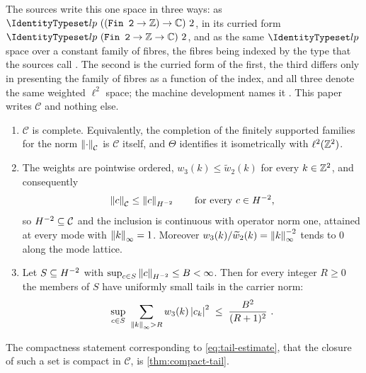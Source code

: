 \begin{remark}\label{rem:carrier-notations}
The sources write this one space in three ways: as
$\lmod{lp}\ ((\texttt{Fin 2}\to\Z)\to\C)\ 2$, in its curried form
$\lmod{lp}\ (\texttt{Fin 2}\to\Z\to\C)\ 2$, and as the same $\lmod{lp}$
space over a constant family of fibres, the fibres being indexed by the type that
the sources call . The second is the curried form of
the first, the third differs only in presenting the family of fibres as a
function of the index, and all three denote the same weighted $\ell^2$ space; the
machine development names it . This paper
writes $\mathcal C$ and nothing else.
\end{remark}

\begin{proposition}\label{prop:completion}
\mbox{}
\begin{enumerate}
\item $\mathcal C$ is complete. Equivalently, the completion of the finitely
  supported families for the norm $\left\| \cdot \right\|_{\mathcal C}$ is $\mathcal C$
  itself, and $\Theta$ identifies it isometrically with $\ell^2(\mathbb{Z}^2)$.
\item The weights are pointwise ordered, $w_3(k)\le\widetilde w_2(k)$ for every
  $k\in\mathbb{Z}^2$, and consequently
  \begin{equation}\label{eq:embedding}
    \left\| c \right\|_{\mathcal C}\le\left\| c \right\|_{H^{-2}}
    \qquad\text{for every } c\in H^{-2},
  \end{equation}
  so $H^{-2}\subseteq\mathcal C$ and the inclusion is continuous with operator
  norm one, attained at every mode with $\left\| k \right\|_\infty=1$. Moreover
  $w_3(k)/\widetilde w_2(k)=\left\| k \right\|_\infty^{-2}$ tends to $0$ along the mode
  lattice.
\item Let $S\subseteq H^{-2}$ with $\sup_{c\in S}\left\| c \right\|_{H^{-2}}\le B<\infty$.
  Then for every integer $R\ge0$ the members of $S$ have uniformly small tails
  in the carrier norm:
  \begin{equation}\label{eq:tail-estimate}
    \sup_{c\in S}\ \sum_{\left\| k \right\|_\infty>R}w_3(k)\left| c_k \right|^2
    \;\le\;\frac{B^2}{(R+1)^2}\ .
  \end{equation}
\end{enumerate}
The compactness statement corresponding to \eqref{eq:tail-estimate}, that the
closure of such a set is compact in $\mathcal C$, is \cref{thm:compact-tail}.
\end{proposition}

